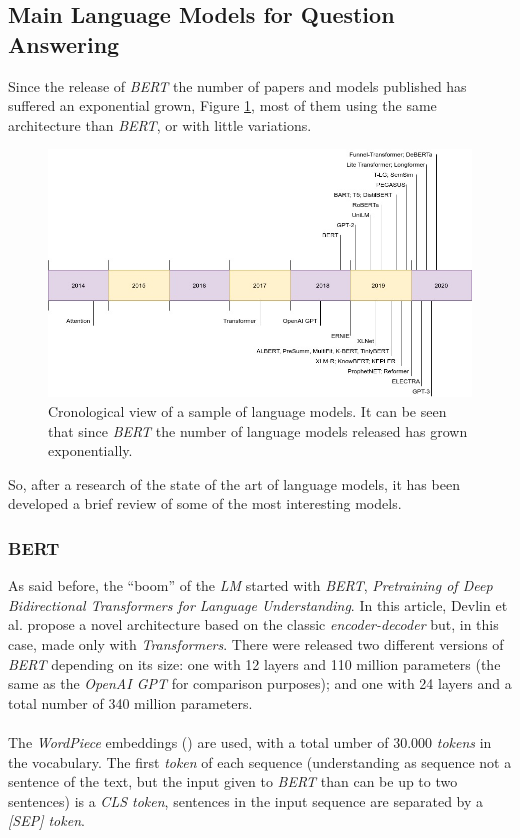 \subsection{Main Language Models for Question Answering}
\noindent Since the release of \emph{BERT} the number of papers and models published has suffered an exponential grown, Figure \ref{fig:cronology}, most of them using the same architecture than \emph{BERT}, or with little variations.
\begin{figure}[h!]
	\centering
	\includegraphics[scale=0.35]{images/cronology}
	\caption{Cronological view of a sample of language models. It can be seen that since \emph{BERT} the number of language models released has grown exponentially.}
	\label{fig:cronology}
\end{figure}
So, after a research of the state of the art of language models, it has been developed a brief review of some of the most interesting models.
\subsubsection{BERT}
\noindent As said before, the ``boom'' of the \emph{LM} started with \emph{BERT}, \emph{Pre\-training of Deep Bidirectional Transformers for Language Understanding}\cite{Devlin2018}. In this article, Devlin et al. propose a novel architecture based on the classic \emph{encoder-decoder} but, in this case, made only with \emph{Transformers}. There were released two different versions of \emph{BERT} depending on its size: one with 12 layers and 110 million parameters (the same as the \emph{OpenAI GPT} for comparison purposes); and one with 24 layers and a total number of 340 million parameters.
\paragraph{}
The \emph{WordPiece} embeddings (\cite{Wu2016}) are used, with a total umber of 30.000 \emph{tokens} in the vocabulary. The first \emph{token} of each sequence (understanding as sequence not a sentence of the text, but the input given to \emph{BERT} than can be up to two sentences) is a \emph{{CLS} token}, sentences in the input sequence are separated by a \emph{[SEP] token}.
